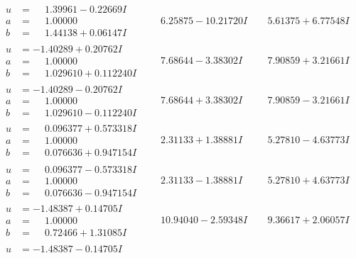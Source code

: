 \documentclass[1p]{elsarticle_modified}
\theoremstyle{definition}
\begin{document}
$$\begin{array}{c|c|c}
\begin{aligned}
u &= \phantom{-}1.39961 - 0.22669 I \\
a &= \phantom{-}1.00000\phantom{ +0.000000I} \\
b &= \phantom{-}1.44138 + 0.06147 I\end{aligned}
 & \phantom{-}6.25875 - 10.21720 I & \phantom{-}5.61375 + 6.77548 I \\ \hline\begin{aligned}
u &= -1.40289 + 0.20762 I \\
a &= \phantom{-}1.00000\phantom{ +0.000000I} \\
b &= \phantom{-}1.029610 + 0.112240 I\end{aligned}
 & \phantom{-}7.68644 - 3.38302 I & \phantom{-}7.90859 + 3.21661 I \\ \hline\begin{aligned}
u &= -1.40289 - 0.20762 I \\
a &= \phantom{-}1.00000\phantom{ +0.000000I} \\
b &= \phantom{-}1.029610 - 0.112240 I\end{aligned}
 & \phantom{-}7.68644 + 3.38302 I & \phantom{-}7.90859 - 3.21661 I \\ \hline\begin{aligned}
u &= \phantom{-}0.096377 + 0.573318 I \\
a &= \phantom{-}1.00000\phantom{ +0.000000I} \\
b &= \phantom{-}0.076636 + 0.947154 I\end{aligned}
 & \phantom{-}2.31133 + 1.38881 I & \phantom{-}5.27810 - 4.63773 I \\ \hline\begin{aligned}
u &= \phantom{-}0.096377 - 0.573318 I \\
a &= \phantom{-}1.00000\phantom{ +0.000000I} \\
b &= \phantom{-}0.076636 - 0.947154 I\end{aligned}
 & \phantom{-}2.31133 - 1.38881 I & \phantom{-}5.27810 + 4.63773 I \\ \hline\begin{aligned}
u &= -1.48387 + 0.14705 I \\
a &= \phantom{-}1.00000\phantom{ +0.000000I} \\
b &= \phantom{-}0.72466 + 1.31085 I\end{aligned}
 & \phantom{-}10.94040 - 2.59348 I & \phantom{-}9.36617 + 2.06057 I \\ \hline\begin{aligned}
u &= -1.48387 - 0.14705 I \\

\end{aligned}
\end{array}$$
\end{document}
